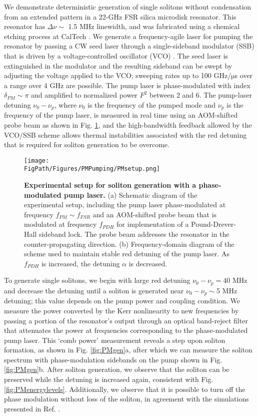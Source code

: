 We demonstrate deterministic generation of single solitons without condensation from an extended pattern in a 22-GHz FSR silica microdisk resonator. This resonator has $\Delta\nu\sim$ 1.5 MHz linewidth, and was fabricated using a chemical etching process at CalTech \cite{Lee2012}. We generate a frequency-agile laser for pumping the resonator by passing a CW seed laser through a single-sideband modulator (SSB) that is driven by a voltage-controlled oscillator (VCO) \cite{Stone2017}. The seed laser is extinguished in the modulator and the resulting sideband can be swept by adjusting the voltage applied to the VCO; sweeping rates up to 100 GHz/$\mathrm{\mu}$s over a range over 4 GHz are possible. The pump laser is phase-modulated with index $\delta_{PM}\sim\pi$ and amplified to normalized power $F^2$ between 2 and 6. The pump-laser detuning $\nu_0-\nu_{p}$, where $\nu_0$ is the frequency of the pumped mode and $\nu_p$ is the frequency of the pump laser, is measured in real time using an AOM-shifted probe beam as shown in Fig. \ref{fig:PMsetup}, and the high-bandwidth feedback allowed by the VCO/SSB scheme allows thermal instabilities associated with the red detuning that is required for soliton generation to be overcome. 

\begin{figure}[htpb]
	\begin{center}
		\texttt{[image: \\FigPath/Figures/PMPumping/PMsetup.png]}
	\end{center}
	\caption[Experimental setup for soliton generation with a phase-modulated pump laser]{\textbf{Experimental setup for soliton generation with a phase-modulated pump laser.} (a) Schematic diagram of the experimental setup, including the pump laser phase-modulated at frequency $f_{PM}\sim f_{FSR}$ and an AOM-shifted probe beam that is modulated at frequency $f_{PDH}$ for implementation of a Pound-Drever-Hall sideband lock. The probe beam addresses the resonator in the counter-propagating direction. (b) Frequency-domain diagram of the scheme used to maintain stable red detuning of the pump laser. As $f_{PDH}$ is increased, the detuning $\alpha$ is decreased.}
	\label{fig:PMsetup}
\end{figure} 


To generate single solitons, we begin with large red detuning $\nu_0-\nu_{p}=$40 MHz and decrease the detuning until a soliton is generated near $\nu_0-\nu_{p}\sim$5 MHz detuning; this value depends on the pump power and coupling condition. We measure the power converted by the Kerr nonlinearity to new frequencies by passing a portion of the resonator's output through an optical band-reject filter that attenuates the power at frequencies corresponding to the phase-modulated pump laser. This `comb power' measurement reveals a step upon soliton formation, as shown in Fig. \ref{fig:PMgen}a, after which we can measure the soliton spectrum with phase-modulation sidebands on the pump shown in Fig. \ref{fig:PMgen}b. After soliton generation, we observe that the soliton can be preserved while the detuning is increased again, consistent with Fig. \ref{fig:PMenergylevels}. Additionally, we observe that it is possible to turn off the phase modulation without loss of the soliton, in agreement with the simulations presented in Ref. .

